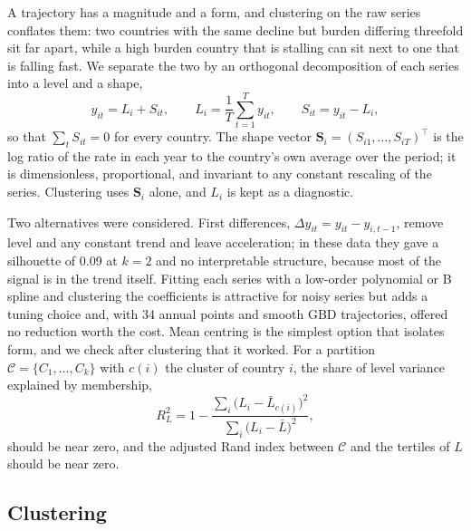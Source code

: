 \documentclass[11pt,a4paper]{article}
\newcommand{\bS}{\mathbf{S}}
\begin{document}
A trajectory has a magnitude and a form, and clustering on the raw series conflates them: two countries with the same decline but burden differing threefold sit far apart, while a high burden country that is stalling can sit next to one that is falling fast. We separate the two by an orthogonal decomposition of each series into a level and a shape,
\begin{equation}\label{eq:decomp}
y_{it} = L_i + S_{it}, \qquad L_i = \frac{1}{T}\sum_{t=1}^{T} y_{it}, \qquad S_{it} = y_{it} - L_i,
\end{equation}
so that $\sum_t S_{it} = 0$ for every country. The shape vector $\bS_i = (S_{i1}, \ldots, S_{iT})^\top$ is the log ratio of the rate in each year to the country's own average over the period; it is dimensionless, proportional, and invariant to any constant rescaling of the series. Clustering uses $\bS_i$ alone, and $L_i$ is kept as a diagnostic.

Two alternatives were considered. First differences, $\Delta y_{it} = y_{it} - y_{i,t-1}$, remove level and any constant trend and leave acceleration; in these data they gave a silhouette of 0.09 at $k = 2$ and no interpretable structure, because most of the signal is in the trend itself. Fitting each series with a low-order polynomial or B spline and clustering the coefficients is attractive for noisy series but adds a tuning choice and, with 34 annual points and smooth GBD trajectories, offered no reduction worth the cost. Mean centring is the simplest option that isolates form, and we check after clustering that it worked. For a partition $\mathcal{C} = \{C_1, \ldots, C_k\}$ with $c(i)$ the cluster of country $i$, the share of level variance explained by membership,
\begin{equation}\label{eq:r2level}
R^2_L = 1 - \frac{\sum_i \bigl(L_i - \bar L_{c(i)}\bigr)^2}{\sum_i \bigl(L_i - \bar L\bigr)^2},
\end{equation}
should be near zero, and the adjusted Rand index \citep{hubert1985} between $\mathcal{C}$ and the tertiles of $L$ should be near zero.

\subsection{Clustering}
\end{document}
